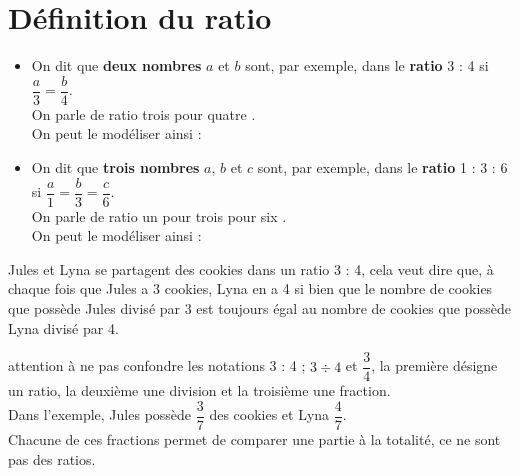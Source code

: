 \cours 

\section{Définition du ratio}

\begin{definition}
   \begin{itemize}
      \item On dit que {\bf deux nombres} $a$ et $b$ sont, par exemple, dans le {\bf ratio} 3 : 4 si $\dfrac{a}{3} =\dfrac{b}{4}$. \\
         On parle de ratio \og trois pour quatre \fg. \\ [2mm]
         On peut le modéliser ainsi : \parbox{7cm}{}
      \item On dit que {\bf trois nombres} $a$, $b$ et $c$ sont, par exemple, dans le {\bf ratio} 1 : 3 : 6 si $\dfrac{a}{1} =\dfrac{b}{3} = \dfrac{c}{6}$. \\
      On parle de ratio \og un pour trois pour six \fg. \\ [2mm]
      On peut le modéliser ainsi : \parbox{7cm}{}
      \vspace{-4mm}
   \end{itemize}
\end{definition}

\begin{exemple*1}
   Jules et Lyna se partagent des cookies dans un ratio 3 : 4, cela veut dire que, à chaque fois que Jules a 3 cookies, Lyna en a 4 si bien que le nombre de cookies que possède Jules divisé par 3 est toujours égal au nombre de cookies que possède Lyna divisé par 4.
\end{exemple*1}

\begin{remarque}
   attention à ne pas confondre les notations 3 : 4 ; $3\div4$ et $\dfrac34$, la première désigne un ratio, la deuxième une division et la troisième une fraction. \\
   Dans l'exemple, Jules possède $\dfrac37$ des cookies et Lyna $\dfrac47$. \\ [1mm]
   Chacune de ces fractions permet de comparer une partie à la totalité, ce ne sont pas des ratios.
\end{remarque}


